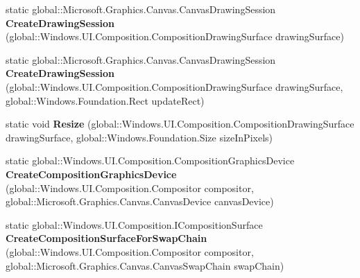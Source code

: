 \begin{DoxyCompactItemize}
static global\+::\+Microsoft.\+Graphics.\+Canvas.\+Canvas\+Drawing\+Session {\bfseries Create\+Drawing\+Session} (global\+::\+Windows.\+U\+I.\+Composition.\+Composition\+Drawing\+Surface drawing\+Surface)
\item 
\mbox{\label{class_microsoft_1_1_graphics_1_1_canvas_1_1_u_i_1_1_composition_1_1_canvas_composition_a55e464bf5949c3a7f758e8313be5e37a}} 
static global\+::\+Microsoft.\+Graphics.\+Canvas.\+Canvas\+Drawing\+Session {\bfseries Create\+Drawing\+Session} (global\+::\+Windows.\+U\+I.\+Composition.\+Composition\+Drawing\+Surface drawing\+Surface, global\+::\+Windows.\+Foundation.\+Rect update\+Rect)
\item 
\mbox{\label{class_microsoft_1_1_graphics_1_1_canvas_1_1_u_i_1_1_composition_1_1_canvas_composition_a73077ba32784e9ec043ebe0500e598ea}} 
static void {\bfseries Resize} (global\+::\+Windows.\+U\+I.\+Composition.\+Composition\+Drawing\+Surface drawing\+Surface, global\+::\+Windows.\+Foundation.\+Size size\+In\+Pixels)
\item 
\mbox{\label{class_microsoft_1_1_graphics_1_1_canvas_1_1_u_i_1_1_composition_1_1_canvas_composition_a3b9f17ccd00ef34c54c31646a4186a94}} 
static global\+::\+Windows.\+U\+I.\+Composition.\+Composition\+Graphics\+Device {\bfseries Create\+Composition\+Graphics\+Device} (global\+::\+Windows.\+U\+I.\+Composition.\+Compositor compositor, global\+::\+Microsoft.\+Graphics.\+Canvas.\+Canvas\+Device canvas\+Device)
\item 
\mbox{\label{class_microsoft_1_1_graphics_1_1_canvas_1_1_u_i_1_1_composition_1_1_canvas_composition_a5b9957a9a95828b0fb6d0e5cacbaa376}} 
static global\+::\+Windows.\+U\+I.\+Composition.\+I\+Composition\+Surface {\bfseries Create\+Composition\+Surface\+For\+Swap\+Chain} (global\+::\+Windows.\+U\+I.\+Composition.\+Compositor compositor, global\+::\+Microsoft.\+Graphics.\+Canvas.\+Canvas\+Swap\+Chain swap\+Chain)
\item 
\mbox{\label{class_microsoft_1_1_graphics_1_1_canvas_1_1_u_i_1_1_composition_1_1_canvas_composition_a3b6e31d08196ba66744cad30ed1a1e1c}} 

\end{DoxyCompactItemize}
